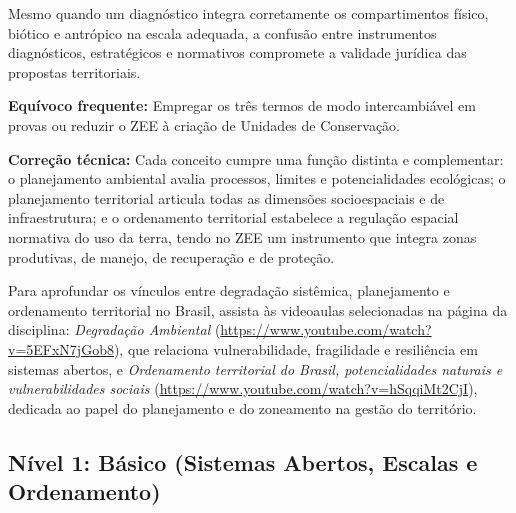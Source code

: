 
Mesmo quando um diagnóstico integra corretamente os compartimentos físico, biótico e antrópico na escala adequada, a confusão entre instrumentos diagnósticos, estratégicos e normativos compromete a validade jurídica das propostas territoriais.

\begin{boxErro}
  \textbf{Equívoco frequente:} Empregar os três termos de modo intercambiável em provas ou reduzir o ZEE à criação de Unidades de Conservação.\par
  \textbf{Correção técnica:} Cada conceito cumpre uma função distinta e complementar: o planejamento ambiental avalia processos, limites e potencialidades ecológicas; o planejamento territorial articula todas as dimensões socioespaciais e de infraestrutura; e o ordenamento territorial estabelece a regulação espacial normativa do uso da terra, tendo no ZEE um instrumento que integra zonas produtivas, de manejo, de recuperação e de proteção.
\end{boxErro}

Para aprofundar os vínculos entre degradação sistêmica, planejamento e ordenamento territorial no Brasil, assista às videoaulas selecionadas na página da disciplina: \textit{Degradação Ambiental} (\url{https://www.youtube.com/watch?v=5EFxN7jGob8}), que relaciona vulnerabilidade, fragilidade e resiliência em sistemas abertos, e \textit{Ordenamento territorial do Brasil, potencialidades naturais e vulnerabilidades sociais} (\url{https://www.youtube.com/watch?v=hSqqiMt2CjI}), dedicada ao papel do planejamento e do zoneamento na gestão do território.


\subsection*{Nível 1: Básico (Sistemas Abertos, Escalas e Ordenamento)}

